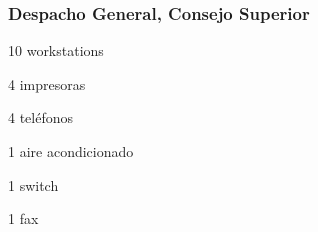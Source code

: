 \documentclass[a4paper,11pt,oneside]{article}
\begin{document}
\subsubsection*{Despacho General, Consejo Superior}
\begin{itemize*}
\item 10 workstations
\item 4 impresoras
\item 4 teléfonos
\item 1 aire acondicionado
\item 1 switch
\item 1 fax
\end{itemize*}
%
\end{document}
